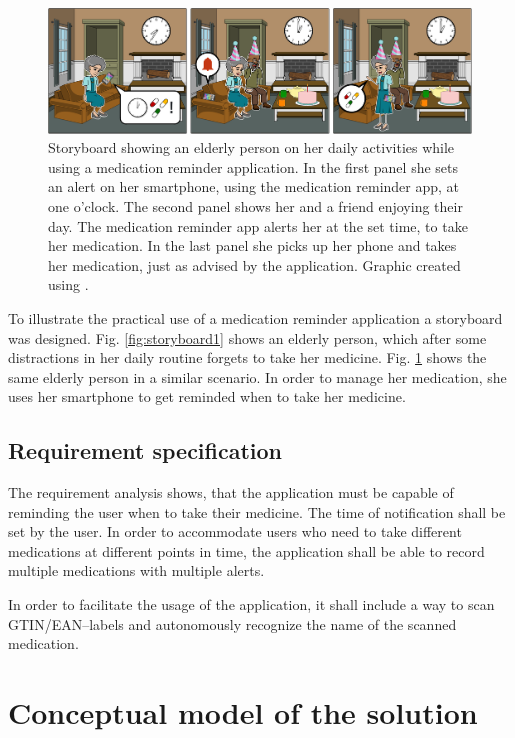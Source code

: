 \documentclass[conference]{IEEEtran}
\begin{document}
\begin{figure}
	\includegraphics[width=\textwidth]{images/storyboard02.png}
	\caption
	{Storyboard showing an elderly person on her daily activities while using a medication reminder application.
		In the first panel she sets an alert on her smartphone, using the medication reminder app, at one o'clock.
		The second panel shows her and a friend enjoying their day. The medication reminder app alerts her at the set time, to take her medication.
		In the last panel she picks up her phone and takes her medication, just as advised by the application.
		Graphic created using \cite{storyboard}.}
	\label{fig:storyboard2}
\end{figure}

To illustrate the practical use of a medication reminder application a storyboard was designed.
Fig. \ref{fig:storyboard1} shows an elderly person, which after some distractions in her daily
routine forgets to take her medicine.
Fig. \ref{fig:storyboard2} shows the same elderly person in a similar scenario. In order to manage
her medication, she uses her smartphone to get reminded when to take her medicine.

\subsection{Requirement specification} \label{sec:requirement_specification}
The requirement analysis shows, that the application must be capable of reminding the user when to take
their medicine. The time of notification shall be set by the user. In order to accommodate users who need
to take different medications at different points in time, the application shall be able to record multiple
medications with multiple alerts.

In order to facilitate the usage of the application, it shall include a way to scan GTIN/EAN--labels and
autonomously recognize the name of the scanned medication.

\section{Conceptual model of the solution}
\end{document}

